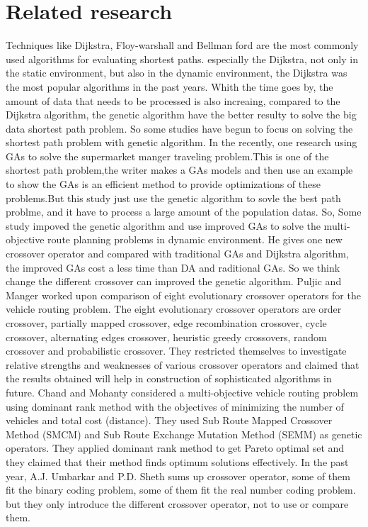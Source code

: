\documentclass[12pt]{article}
\begin{document}
\section{Related research}	
Techniques like Dijkstra, Floy-warshall and Bellman ford are the most commonly used algorithms for evaluating shortest paths. especially the Dijkstra, not only in the static environment, but also in the dynamic environment\cite{10.1007/978-3-319-60042-0_15}, the Dijkstra was the most popular algorithms in the past years. Whith the time goes by, the amount of data that needs to be processed is also increaing, compared to the Dijkstra algorithm, the genetic algorithm have the better resulty to solve the big data shortest path problem\cite{Wang2018}. So some studies have begun to focus on solving the shortest path  problem with genetic algorithm. In the recently, one research using GAs to solve the supermarket manger traveling problem\cite{Al-hayali2018}.This is one of the shortest path problem,the writer makes a GAs models and then use an example to show the GAs is an efficient method to provide optimizations of these problems.But this study just use the genetic algorithm to sovle the best path problme, and it have to process a large amount of the population datas. So, Some study impoved the genetic algorithm and use improved GAs to solve the multi-objective route planning problems in dynamic environment\cite{Kanoh2008}. He gives one new crossover operator and compared with traditional GAs and Dijkstra algorithm, the improved GAs cost a less time than DA and raditional GAs. So we think change the different crossover can improved the genetic algorithm. Puljic and Manger \cite{Puljic2013} worked upon comparison of eight evolutionary crossover operators for the vehicle routing problem. The eight evolutionary crossover operators are order crossover, partially mapped crossover, edge recombination crossover, cycle crossover, alternating edges crossover, heuristic greedy crossovers, random crossover and probabilistic crossover. They restricted themselves to investigate relative strengths and weaknesses of various crossover operators and claimed that the results obtained will help in construction of sophisticated algorithms in future. Chand and Mohanty \cite{Chand2013} considered a multi-objective vehicle routing problem using dominant rank method with the objectives of minimizing the number of vehicles and total cost (distance). They used Sub Route Mapped Crossover Method (SMCM) and Sub Route Exchange Mutation Method (SEMM) as genetic operators. They applied dominant rank method to get Pareto optimal set and they claimed that their method finds optimum solutions effectively. In the past year, A.J. Umbarkar and P.D. Sheth\cite{Umbarkar2015} sums up crossover operator, some of them fit the binary coding problem, some of them fit the real number coding problem. but they only introduce the different crossover operator, not to use or compare them.  
\end{document}
